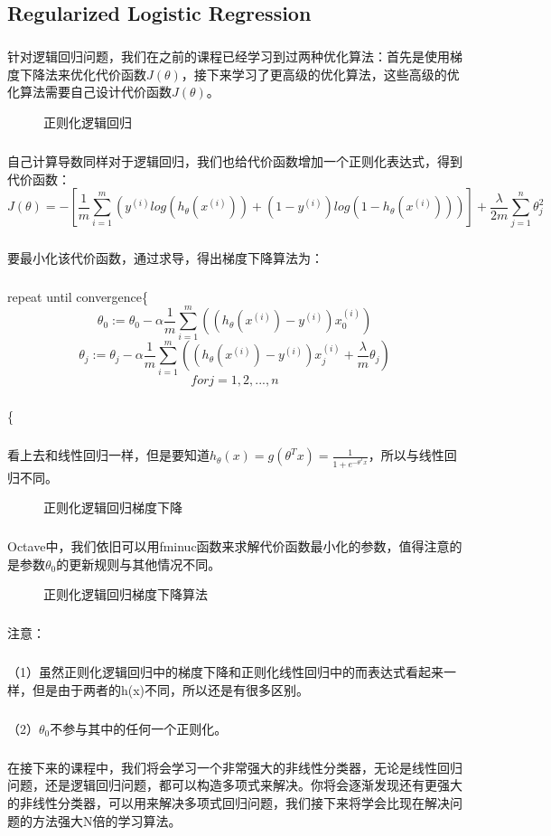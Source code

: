 \documentclass{article}
\begin{document}
\begin{CJK}{UTF8}{gbsn}
\subsection{Regularized Logistic Regression}
\subparagraph{}
针对逻辑回归问题，我们在之前的课程已经学习到过两种优化算法：首先是使用梯度下降法来优化代价函数$J(\theta)$，接下来学习了更高级的优化算法，这些高级的优化算法需要自己设计代价函数$J(\theta)$。
\begin{figure}[H]
\caption{正则化逻辑回归}
\label{fig:370}
\end{figure}
\subparagraph{}
自己计算导数同样对于逻辑回归，我们也给代价函数增加一个正则化表达式，得到代价函数：
\begin{equation}
J(\theta)=-[\frac{1}{m}\sum_{i=1}^m(y^{(i)}log(h_\theta(x^{(i)}))+(1-y^{(i)})log(1-h_\theta(x^{(i)})))]+\frac{\lambda}{2m}\sum_{j=1}^n\theta_j^2
\end{equation}
\subparagraph{}
要最小化该代价函数，通过求导，得出梯度下降算法为：
\subparagraph{}
repeat until convergence\{{}
\begin{equation}
\theta_0:=\theta_0-\alpha\frac{1}{m}\sum_{i=1}^m((h_\theta(x^{(i)})-y^{(i)})x_0^{(i)})
\end{equation}
\begin{equation}
\theta_j:=\theta_j-\alpha\frac{1}{m}\sum_{i=1}^m((h_\theta(x^{(i)})-y^{(i)})x_j^{(i)}+\frac{\lambda}{m}\theta_j)
\end{equation}
\begin{equation}
for j=1,2,...,n
\end{equation}
\subparagraph{}
\{{}
\subparagraph{}
看上去和线性回归一样，但是要知道$h_\theta(x)=g(\theta^Tx)=\frac{1}{1+e^{-\theta^Tx}}$，所以与线性回归不同。
\begin{figure}[H]
\caption{正则化逻辑回归梯度下降}
\label{fig:372}
\end{figure}
\subparagraph{}
Octave中，我们依旧可以用fminuc函数来求解代价函数最小化的参数，值得注意的是参数$\theta_0$的更新规则与其他情况不同。
\begin{figure}[H]
\caption{正则化逻辑回归梯度下降算法}
\label{fig:373}
\end{figure}
\subparagraph{}
注意：
\subparagraph{}
（1）虽然正则化逻辑回归中的梯度下降和正则化线性回归中的而表达式看起来一样，但是由于两者的h(x)不同，所以还是有很多区别。
\subparagraph{}
（2）$\theta_0$不参与其中的任何一个正则化。
\subparagraph{}
在接下来的课程中，我们将会学习一个非常强大的非线性分类器，无论是线性回归问题，还是逻辑回归问题，都可以构造多项式来解决。你将会逐渐发现还有更强大的非线性分类器，可以用来解决多项式回归问题，我们接下来将学会比现在解决问题的方法强大N倍的学习算法。
\end{CJK}
\end{document}
